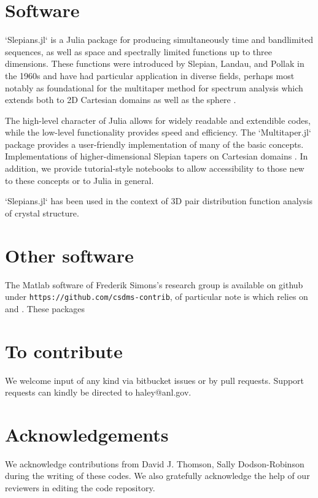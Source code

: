 \documentclass[preprint,12pt]{elsarticle}
\begin{document}
\section{Software}

`Slepians.jl` is a Julia package for producing simultaneously time and bandlimited
sequences, as well as space and spectrally limited functions up to three dimensions.
These functions were introduced by Slepian, Landau, and Pollak in the 1960s and have
had particular application in diverse fields, perhaps most notably as foundational
for the multitaper method for spectrum analysis \cite{T82} which extends both to 2D
Cartesian domains \cite{SimonsWang2011} as well as the sphere \cite{simons2006}. 

The high-level character of Julia allows for widely readable and extendible codes,
while the low-level functionality provides speed and efficiency. The `Multitaper.jl`
package provides a user-friendly implementation of many of the basic concepts.
Implementations of higher-dimensional Slepian tapers on Cartesian domains
\cite{SimonsWang2011,Geoga2018}. In addition, we provide tutorial-style notebooks to
allow accessibility to those new to these concepts or to Julia in general.

`Slepians.jl` has been used in the context of 3D pair distribution function analysis
of crystal structure. 

\section{Other software}

The Matlab software of Frederik Simons's research group is available on github under
\texttt{https://github.com/csdms-contrib}, of particular note is \cite{slepian_foxtrot}
which relies on \cite{slepian_alpha} and \cite{slepian_delta}. These packages

\section{To contribute}

We welcome input of any kind via bitbucket issues or by pull requests.
Support requests can kindly be directed to haley@anl.gov.

\section{Acknowledgements}

We acknowledge contributions from David J. Thomson, Sally
Dodson-Robinson during the writing of these codes. We also gratefully acknowledge the
help of our reviewers in editing the code repository.
\end{document}
